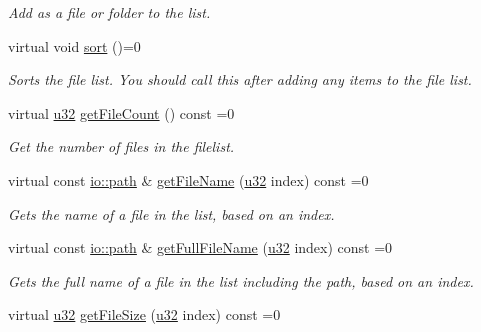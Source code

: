 \begin{DoxyCompactItemize}
\begin{DoxyCompactList}\small\item\em Add as a file or folder to the list. \end{DoxyCompactList}\item 
\mbox{\label{classirr_1_1io_1_1IFileList_a2cf4f12d7ee6ab35257169ec23654da8}} 
virtual void \hyperlink{classirr_1_1io_1_1IFileList_a2cf4f12d7ee6ab35257169ec23654da8}{sort} ()=0
\begin{DoxyCompactList}\small\item\em Sorts the file list. You should call this after adding any items to the file list. \end{DoxyCompactList}\item 
virtual \hyperlink{namespaceirr_a0416a53257075833e7002efd0a18e804}{u32} \hyperlink{classirr_1_1io_1_1IFileList_a871861be76e18d58274c4580b1d103b9}{get\+File\+Count} () const =0
\begin{DoxyCompactList}\small\item\em Get the number of files in the filelist. \end{DoxyCompactList}\item 
virtual const \hyperlink{namespaceirr_1_1io_a6468281622ce3a1c46b72e19f32dded5}{io\+::path} \& \hyperlink{classirr_1_1io_1_1IFileList_ab4e0330adf34afa3c21e06ff0b4e84d5}{get\+File\+Name} (\hyperlink{namespaceirr_a0416a53257075833e7002efd0a18e804}{u32} index) const =0
\begin{DoxyCompactList}\small\item\em Gets the name of a file in the list, based on an index. \end{DoxyCompactList}\item 
virtual const \hyperlink{namespaceirr_1_1io_a6468281622ce3a1c46b72e19f32dded5}{io\+::path} \& \hyperlink{classirr_1_1io_1_1IFileList_a063c823f58019bda79efabefabe365da}{get\+Full\+File\+Name} (\hyperlink{namespaceirr_a0416a53257075833e7002efd0a18e804}{u32} index) const =0
\begin{DoxyCompactList}\small\item\em Gets the full name of a file in the list including the path, based on an index. \end{DoxyCompactList}\item 
virtual \hyperlink{namespaceirr_a0416a53257075833e7002efd0a18e804}{u32} \hyperlink{classirr_1_1io_1_1IFileList_a305561d0c5db74ac721da5d26c461b36}{get\+File\+Size} (\hyperlink{namespaceirr_a0416a53257075833e7002efd0a18e804}{u32} index) const =0

\end{DoxyCompactItemize}
